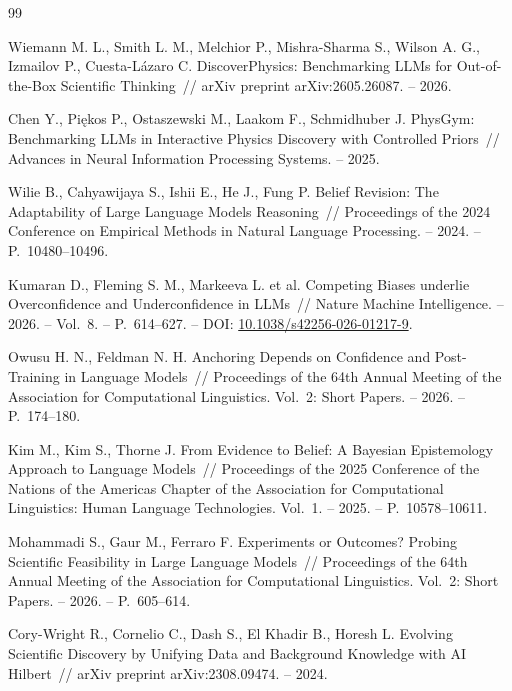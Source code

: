\documentclass[a4paper,14pt]{extarticle}
\begin{document}
\clearpage
\renewcommand{\refname}{Список использованных источников}
\begin{thebibliography}{99}

Wiemann M. L., Smith L. M., Melchior P., Mishra-Sharma S., Wilson A. G., Izmailov P., Cuesta-Lázaro C. DiscoverPhysics: Benchmarking LLMs for Out-of-the-Box Scientific Thinking~// arXiv preprint arXiv:2605.26087. -- 2026.

Chen Y., Pi\k{e}kos P., Ostaszewski M., Laakom F., Schmidhuber J. PhysGym: Benchmarking LLMs in Interactive Physics Discovery with Controlled Priors~// Advances in Neural Information Processing Systems. -- 2025.

Wilie B., Cahyawijaya S., Ishii E., He J., Fung P. Belief Revision: The Adaptability of Large Language Models Reasoning~// Proceedings of the 2024 Conference on Empirical Methods in Natural Language Processing. -- 2024. -- P.~10480--10496.

Kumaran D., Fleming S. M., Markeeva L. et al. Competing Biases underlie Overconfidence and Underconfidence in LLMs~// Nature Machine Intelligence. -- 2026. -- Vol.~8. -- P.~614--627. -- DOI: \href{https://doi.org/10.1038/s42256-026-01217-9}{10.1038/s42256-026-01217-9}.

Owusu H. N., Feldman N. H. Anchoring Depends on Confidence and Post-Training in Language Models~// Proceedings of the 64th Annual Meeting of the Association for Computational Linguistics. Vol.~2: Short Papers. -- 2026. -- P.~174--180.

Kim M., Kim S., Thorne J. From Evidence to Belief: A Bayesian Epistemology Approach to Language Models~// Proceedings of the 2025 Conference of the Nations of the Americas Chapter of the Association for Computational Linguistics: Human Language Technologies. Vol.~1. -- 2025. -- P.~10578--10611.

Mohammadi S., Gaur M., Ferraro F. Experiments or Outcomes? Probing Scientific Feasibility in Large Language Models~// Proceedings of the 64th Annual Meeting of the Association for Computational Linguistics. Vol.~2: Short Papers. -- 2026. -- P.~605--614.

Cory-Wright R., Cornelio C., Dash S., El Khadir B., Horesh L. Evolving Scientific Discovery by Unifying Data and Background Knowledge with AI Hilbert~// arXiv preprint arXiv:2308.09474. -- 2024.


\end{thebibliography}
\end{document}
